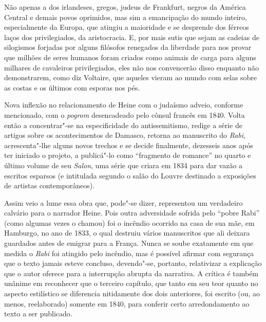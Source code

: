 \begin{hedraquote}
Não apenas a dos irlandeses, gregos, judeus de Frankfurt, negros da América
Central e demais povos oprimidos, mas sim a emancipação do mundo
inteiro, especialmente da Europa, que atingiu a maioridade e se
desprende dos férreos laços dos privilegiados, da aristocracia. E, por
mais sutis que sejam as cadeias de silogismos forjadas por alguns
filósofos renegados da liberdade para nos provar que milhões de seres
humanos foram criados como animais de carga para alguns milhares de
cavaleiros privilegiados, eles não nos convencerão disso enquanto não
demonstrarem, como diz Voltaire, que aqueles vieram ao mundo com selas
sobre as costas e os últimos com esporas nos pés.
\end{hedraquote}

Nova inflexão no relacionamento de Heine com o judaísmo adveio, conforme
mencionado, com o \textit{pogrom} desencadeado pelo cônsul francês em
1840. Volta então a concentrar"-se na especificidade do
antissemitismo, redige a série de artigos sobre os acontecimentos de
Damasco, retorna ao manuscrito do \textit{Rabi}, acrescenta"-lhe alguns
novos trechos e se decide finalmente, dezesseis anos após ter iniciado
o projeto, a publicá"-lo como “fragmento de romance” no quarto e
último volume de seu \textit{Salon}, uma série que criara em 1834 para
dar vazão a escritos esparsos (e intitulada segundo o salão do Louvre
destinado a exposições de artistas contemporâneos).

Assim veio a lume essa obra que, pode"-se dizer, representou um
verdadeiro calvário para o narrador Heine. Pois outra adversidade
sofrida pelo “pobre Rabi” (como algumas vezes o chamou) foi o incêndio
ocorrido na casa de sua mãe, em Hamburgo, no ano de 1833, o qual
destruiu vários manuscritos que ali deixara guardados antes de emigrar
para a França. Nunca se soube exatamente em que medida o \textit{Rabi}
foi atingido pelo incêndio, mas é possível afirmar com segurança que o
texto jamais esteve concluso, devendo"-se, portanto, relativizar a
explicação que o autor oferece para a interrupção abrupta da narrativa.
A crítica é também unânime em reconhecer que o terceiro capítulo, que
tanto em seu teor quanto no aspecto estilístico se diferencia
nitidamente dos dois anteriores, foi escrito (ou, ao menos,
reelaborado) somente em 1840, para conferir certo arredondamento ao
texto a ser publicado.

